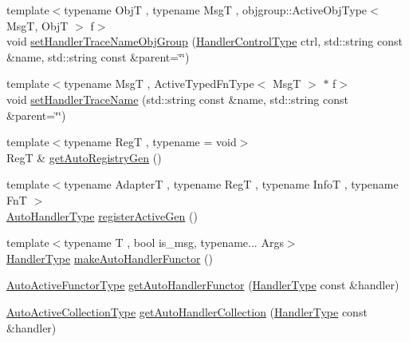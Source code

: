 \begin{DoxyCompactItemize}
\item 
{\footnotesize template$<$typename ObjT , typename MsgT , objgroup\+::\+Active\+Obj\+Type$<$ Msg\+T, Obj\+T $>$ f$>$ }\\void \hyperlink{namespacevt_1_1auto__registry_a1eb25883c6f5332dbbf4a61bd22bbf2f}{set\+Handler\+Trace\+Name\+Obj\+Group} (\hyperlink{namespacevt_adbbef13b92f0a93b14c219b7cc8a48f2}{Handler\+Control\+Type} ctrl, std\+::string const \&name, std\+::string const \&parent=\char`\"{}\char`\"{})
\item 
{\footnotesize template$<$typename MsgT , Active\+Typed\+Fn\+Type$<$ Msg\+T $>$ $\ast$ f$>$ }\\void \hyperlink{namespacevt_1_1auto__registry_a9239b3d69aac342e6b7d7554ef84a9cc}{set\+Handler\+Trace\+Name} (std\+::string const \&name, std\+::string const \&parent=\char`\"{}\char`\"{})
\item 
{\footnotesize template$<$typename RegT , typename  = void$>$ }\\RegT \& \hyperlink{namespacevt_1_1auto__registry_ab2ee3a933397aba4f50be12646be5fa7}{get\+Auto\+Registry\+Gen} ()
\item 
{\footnotesize template$<$typename AdapterT , typename RegT , typename InfoT , typename FnT $>$ }\\\hyperlink{namespacevt_1_1auto__registry_ae295e18699146815bb7d7674594d95d7}{Auto\+Handler\+Type} \hyperlink{namespacevt_1_1auto__registry_aa16ec3feb8483e91ba4775b634ba0c65}{register\+Active\+Gen} ()
\item 
{\footnotesize template$<$typename T , bool is\+\_\+msg, typename... Args$>$ }\\\hyperlink{namespacevt_af64846b57dfcaf104da3ef6967917573}{Handler\+Type} \hyperlink{namespacevt_1_1auto__registry_a473fb7ec675cc28fde0d6b0c5b19ac19}{make\+Auto\+Handler\+Functor} ()
\item 
\hyperlink{namespacevt_1_1auto__registry_a0efe8e4e502d6a88a8eb50d7d909228d}{Auto\+Active\+Functor\+Type} \hyperlink{namespacevt_1_1auto__registry_ac5906cc1ef94ef7e40eb4416d5acb9d5}{get\+Auto\+Handler\+Functor} (\hyperlink{namespacevt_af64846b57dfcaf104da3ef6967917573}{Handler\+Type} const \&handler)
\item 
\hyperlink{namespacevt_1_1auto__registry_a3a45df4bb1c58e5178e3c0cf349baea4}{Auto\+Active\+Collection\+Type} \hyperlink{namespacevt_1_1auto__registry_a57222c242fd475430d4c192ca85edd17}{get\+Auto\+Handler\+Collection} (\hyperlink{namespacevt_af64846b57dfcaf104da3ef6967917573}{Handler\+Type} const \&handler)
\item 

\end{DoxyCompactItemize}
